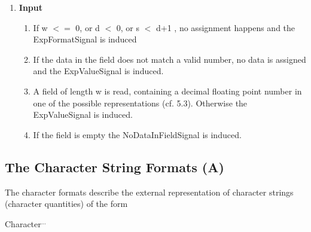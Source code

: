\begin{enumerate}
\begin{enumerate}
\end{enumerate}
 
\item {\bf Input}\\
\begin{enumerate}
\item If w $<=$ 0, or d $<$ 0, or s $<$ 
d+1 , no assignment happens and  
         the ExpFormatSignal is induced
\item If the data in the field does not match a valid number, 
 no data is assigned and the ExpValueSignal is induced.
\item A field of length w is read,
    containing a decimal floating point number
    in one of the possible representations (cf. 5.3).
    Otherwise the ExpValueSignal is induced.
\item If the field is empty the NoDataInFieldSignal is induced.
\end{enumerate}
\end{enumerate}


\subsection{The Character String Formats (A)}  %
\label{sec_dation_a_format}




The character formats describe the external representation of character
strings (character quantities) of the form

Character$^{...}$


